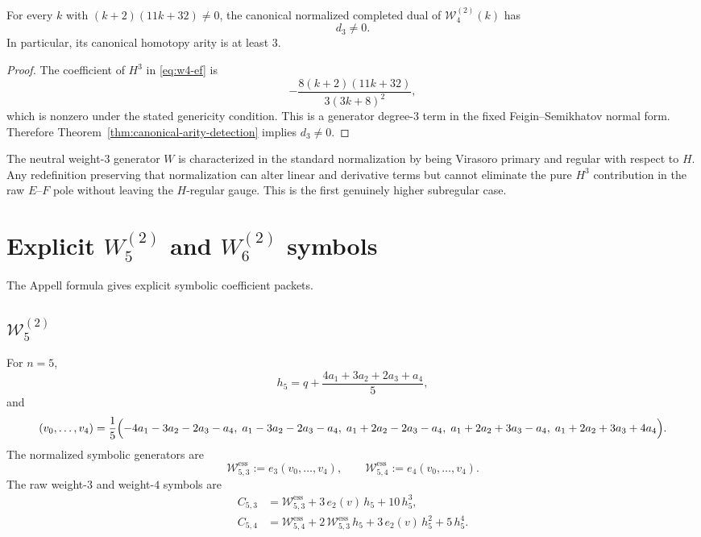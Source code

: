 \begin{theorem}
\label{thm:w4-cubic}
For every $k$ with $(k+2)(11k+32)\neq 0$, the canonical normalized completed
dual of $\mathcal W_4^{(2)}(k)$ has
\[
d_3\neq 0.
\]
In particular, its canonical homotopy arity is at least $3$.
\end{theorem}

\begin{proof}
The coefficient of $H^3$ in \eqref{eq:w4-ef} is
\[
-\frac{8(k+2)(11k+32)}{3(3k+8)^2},
\]
which is nonzero under the stated genericity condition.  This is a generator
degree-$3$ term in the fixed Feigin--Semikhatov normal form.  Therefore
Theorem~\ref{thm:canonical-arity-detection} implies $d_3\neq 0$.
\end{proof}

\begin{remark}
The neutral weight-$3$ generator $W$ is characterized in the standard
normalization by being Virasoro primary and regular with respect to $H$.  Any
redefinition preserving that normalization can alter linear and derivative terms
but cannot eliminate the pure $H^3$ contribution in the raw $E$--$F$ pole
without leaving the $H$-regular gauge.  This is the first genuinely higher
subregular case.
\end{remark}

\section{Explicit \texorpdfstring{$W_5^{(2)}$}{W5(2)} and \texorpdfstring{$W_6^{(2)}$}{W6(2)} symbols}

The Appell formula gives explicit symbolic coefficient packets.

\subsection{\texorpdfstring{$\mathcal W_5^{(2)}$}{W5(2)}}

For $n=5$,
\[
h_5=q+\frac{4a_1+3a_2+2a_3+a_4}{5},
\]
and
\[
(v_0,\dots,v_4)
=
\frac{1}{5}
\Bigl(
-4a_1-3a_2-2a_3-a_4,\;
a_1-3a_2-2a_3-a_4,\;
a_1+2a_2-2a_3-a_4,\;
a_1+2a_2+3a_3-a_4,\;
a_1+2a_2+3a_3+4a_4
\Bigr).
\]
The normalized symbolic generators are
\[
\mathcal W^{\mathrm{ess}}_{5,3}:=e_3(v_0,\dots,v_4),
\qquad
\mathcal W^{\mathrm{ess}}_{5,4}:=e_4(v_0,\dots,v_4).
\]
The raw weight-$3$ and weight-$4$ symbols are
\begin{align}
C_{5,3}
&=
\mathcal W^{\mathrm{ess}}_{5,3}
+ 3\,e_2(v)\,h_5
+ 10\,h_5^3,
\label{eq:w5-c3}
\\[4pt]
C_{5,4}
&=
\mathcal W^{\mathrm{ess}}_{5,4}
+ 2\,\mathcal W^{\mathrm{ess}}_{5,3}\,h_5
+ 3\,e_2(v)\,h_5^2
+ 5\,h_5^4.
\label{eq:w5-c4}
\end{align}

